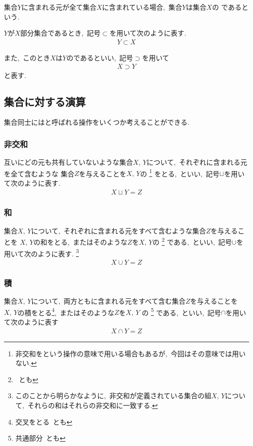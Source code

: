 \documentclass[hyperref,a4paper,12pt]{kininaruki}
\begin{document}
\emptyline
集合$Y$に含まれる元が全て集合$X$に含まれている場合,\, 集合$Y$は集合$X$の
であるという.
\emptyline
\begin{shadebox}
$Y$が$X$部分集合であるとき,\, 記号$\subset$を用いて次のように表す.
\begin{align}
    Y \subset X
\end{align}
\begin{boxnote}
また,\, このとき$X$は$Y$のであるといい,\, 記号$\supset$を用いて
\begin{align}
    X \supset Y
\end{align}
と表す.
\end{boxnote}
\end{shadebox}
\newpage
\subsection{集合に対する演算}
集合同士にはと呼ばれる操作をいくつか考えることができる.
\subsubsection{非交和}
互いにどの元も共有していないような集合$X,\, Y$について,\, それぞれに含まれる元を全て含むような
集合$Z$を与えることを$X,\, Y$の
\footnote{非交和をという操作の意味で用いる場合もあるが,\, 今回はその意味では用いない.}
をとる,\, といい,\, 記号$\sqcup$を用いて次のように表す.
\begin{align}
    X \sqcup Y = Z
\end{align}
\emptyline
\subsubsection{和}
集合$X,\, Y$について,\, それぞれに含まれる元をすべて含むような集合$Z$を与えることを
$X,\, Y$の和をとる,\, またはそのような$Z$を$X,\, Y$の
\footnote{\, とも}
である,\, といい,\, 記号$\cup$を用いて次のように表す.
\footnote{このことから明らかなように,\, 非交和が定義されている集合の組$X,\, Y$について,\, 
それらの和はそれらの非交和に一致する.}
\begin{align}
    X \cup Y = Z
\end{align}
\subsubsection{積}
集合$X,\, Y$について,\, 両方ともに含まれる元をすべて含む集合$Z$を与えることを
$X,\, Y$の積をとる\footnote{交叉をとる\, とも},\, またはそのような$Z$を$X,\, Y$%
の
\footnote{共通部分\, とも}
である,\, といい,\, 記号$\cap$を用いて次のように表す
\begin{align}
    X \cap Y =Z
\end{align}
\newpage
\end{document}
